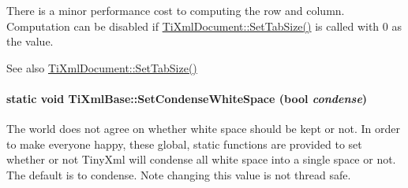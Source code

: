 There is a minor performance cost to computing the row and column. Computation can be disabled if \hyperlink{class_ti_xml_document_a51dac56316f89b35bdb7d0d433ba988e}{TiXmlDocument::SetTabSize()} is called with 0 as the value.

\begin{DoxySeeAlso}{See also}
\hyperlink{class_ti_xml_document_a51dac56316f89b35bdb7d0d433ba988e}{TiXmlDocument::SetTabSize()} 
\end{DoxySeeAlso}
\hypertarget{class_ti_xml_base_a0f799ec645bfb8d8a969e83478f379c1}{
\paragraph[{SetCondenseWhiteSpace}]{\setlength{\rightskip}{0pt plus 5cm}static void TiXmlBase::SetCondenseWhiteSpace (bool {\em condense})}\hfill}
\label{class_ti_xml_base_a0f799ec645bfb8d8a969e83478f379c1}
The world does not agree on whether white space should be kept or not. In order to make everyone happy, these global, static functions are provided to set whether or not TinyXml will condense all white space into a single space or not. The default is to condense. Note changing this value is not thread safe. 

